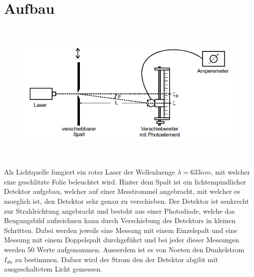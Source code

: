 \section{Aufbau}
\begin{figure}[H]
    \centering
    \captionsetup{justification=centering}
    \includegraphics[height=7cm]{"Aufbau_BeugungSpalt.png"}
    \label{Fig:Aufbau}
\end{figure}
Als Lichtquelle fungiert ein roter Laser der Wellenlaenge $\lambda=633nm$, mit welcher eine geschlitzte Folie beleuchtet wird. Hinter dem Spalt ist ein lichtempindlicher Detektor aufgebau, welcher auf einer Messtrommel angebracht, mit welcher es moeglich ist, den Detektor sehr genau zu verschieben. Der Detektor ist senkrecht zur Strahlrichtung angebracht und besteht aus einer Photodiode, welche das Beugungsbild aufzeichnen kann durch Verschiebung des Detektors in kleinen Schritten. Dabei werden jeweils eine Messung mit einem Einzelspalt und eine Messung mit einem Doppelspalt durchgeführt und bei jeder dieser Messungen werden 50 Werte aufgenommen. Ausserdem ist es von Noeten den Dunkelstrom $I_{du}$ zu bestimmen. Dafuer wird der Strom den der Detektor abgibt mit ausgeschaltetem Licht gemessen.